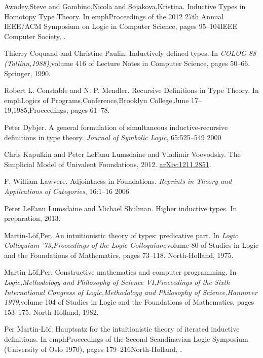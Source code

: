 \documentclass[12pt]{article}
\begin{document}
\begin{thebibliography}{99}

 {Awodey,Steve and Gambino,Nicola and Sojakova,Kristina}. {Inductive Types in Homotopy Type Theory}. In emph{Proceedings of the 2012 27th Annual IEEE/ACM Symposium on Logic in Computer Science}, pages {95--104}{IEEE Computer Society}, .

 {Thierry Coquand and Christine Paulin}. {Inductively defined types}. In \emph{COLOG-88 (Tallinn,1988)},volume {416} of {Lecture Notes in Computer Science}, pages {50--66}. {Springer}, {1990}.

 {Robert L. Constable and N. P. Mendler}. {Recursive Definitions in Type Theory}. In emph{Logics of Programs,Conference,{B}rooklyn College,{J}une 17--19,1985,Proceedings}, pages {61--78}.

 {Peter Dybjer}. {A general formulation of simultaneous inductive-recursive definitions in type theory}. \emph{Journal of Symbolic Logic}, {65}:{525--549} {2000}

 {Chris Kapulkin and Peter LeFanu Lumsdaine and Vladimir Voevodsky}. {The Simplicial Model of Univalent Foundations}, 2012. {\href{http://arxiv.org/abs/1211.2851/}{arXiv:1211.2851}}.

 {F. William Lawvere}. {Adjointness in Foundations}. \emph{Reprints in Theory and Applications of Categories}, {16}:{1--16} {2006}

 {Peter LeFanu Lumsdaine and Michael Shulman}. {Higher inductive types}. {In preparation}, 2013.

 {Martin-L{\"o}f,Per}. {An intuitionistic theory of types: predicative part}. In \emph{Logic Colloquium '73,Proceedings of the Logic Colloquium},volume 80 of {Studies in Logic and the Foundations of Mathematics}, pages {73--118}. {North-Holland}, 1975.

 {Martin-L{\"o}f,Per}. {Constructive mathematics and computer programming}. In \emph{Logic,Methodology and Philosophy of Science VI,Proceedings of the Sixth International Congress of Logic,Methodology and Philosophy of Science,Hannover 1979},volume 104 of {Studies in Logic and the Foundations of Mathematics}, pages {153--175}. {North-Holland}, 1982.

 {Per Martin-L{\"{o}}f}. {Hauptsatz for the intuitionistic theory of iterated inductive definitions}. In emph{Proceedings of the Second Scandinavian Logic Symposium (University of Oslo 1970)}, pages {179--216}{North-Holland}, .


\end{thebibliography}
\end{document}
